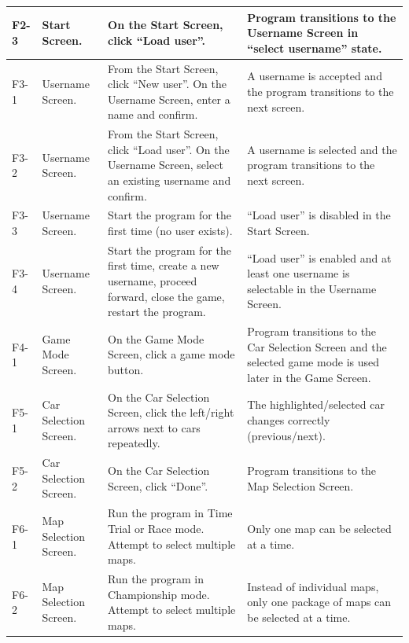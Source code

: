\documentclass[12pt]{article}
\begin{document}
\begin{longtable}{|l|p{}|p{}|p{}|}
F2-3 & Start Screen. &
On the Start Screen, click “Load user”. &
Program transitions to the Username Screen in “select username” state. \\
\hline

F3-1 & Username Screen. &
From the Start Screen, click “New user”. On the Username Screen, enter a name and confirm. &
A username is accepted and the program transitions to the next screen. \\
\hline

F3-2 & Username Screen. &
From the Start Screen, click “Load user”. On the Username Screen, select an existing username and confirm. &
A username is selected and the program transitions to the next screen. \\
\hline

F3-3 & Username Screen. &
Start the program for the first time (no user exists). &
“Load user” is disabled in the Start Screen. \\
\hline

F3-4 & Username Screen. &
Start the program for the first time, create a new username, proceed forward, close the game, restart the program. &
“Load user” is enabled and at least one username is selectable in the Username Screen. \\
\hline

F4-1 & Game Mode Screen. &
On the Game Mode Screen, click a game mode button. &
Program transitions to the Car Selection Screen and the selected game mode is used later in the Game Screen. \\
\hline

F5-1 & Car Selection Screen. &
On the Car Selection Screen, click the left/right arrows next to cars repeatedly. &
The highlighted/selected car changes correctly (previous/next). \\
\hline

F5-2 & Car Selection Screen. &
On the Car Selection Screen, click “Done”. &
Program transitions to the Map Selection Screen. \\
\hline

F6-1 & Map Selection Screen. &
Run the program in Time Trial or Race mode. Attempt to select multiple maps. &
Only one map can be selected at a time. \\
\hline

F6-2 & Map Selection Screen. &
Run the program in Championship mode. Attempt to select multiple maps. &
Instead of individual maps, only one package of maps can be selected at a time. \\
\hline


\end{longtable}
\end{document}
